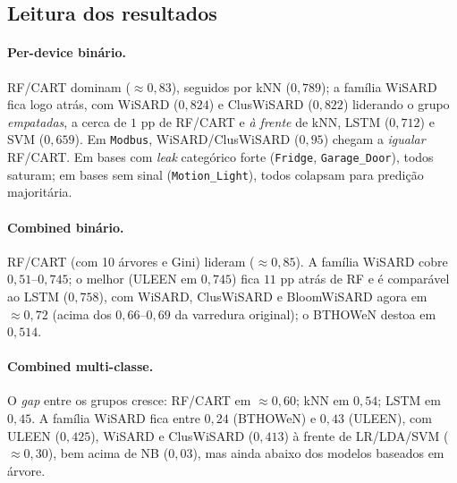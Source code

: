 \subsection{Leitura dos resultados}
\label{sec:leitura}

\paragraph{Per-device binário.} RF/CART dominam ($\approx 0{,}83$),
seguidos por kNN ($0{,}789$); a família WiSARD fica logo atrás, com
WiSARD ($0{,}824$) e ClusWiSARD ($0{,}822$) liderando o grupo
\emph{empatadas}, a cerca de $1$ pp de RF/CART e \emph{à frente} de
kNN, LSTM ($0{,}712$) e SVM ($0{,}659$). Em \texttt{Modbus},
WiSARD/ClusWiSARD ($0{,}95$) chegam a \emph{igualar} RF/CART. Em bases
com \emph{leak} categórico forte (\texttt{Fridge}, \texttt{Garage\_Door}),
todos saturam; em bases sem sinal (\texttt{Motion\_Light}), todos
colapsam para predição majoritária.

\paragraph{Combined binário.} RF/CART (com 10 árvores e Gini)
lideram ($\approx 0{,}85$). A família WiSARD cobre $0{,}51$--$0{,}745$;
o melhor (ULEEN em $0{,}745$) fica $11$ pp atrás de RF e é comparável
ao LSTM ($0{,}758$), com WiSARD, ClusWiSARD e BloomWiSARD agora em
$\approx 0{,}72$ (acima dos $0{,}66$--$0{,}69$ da varredura original);
o BTHOWeN destoa em $0{,}514$.

\paragraph{Combined multi-classe.} O \emph{gap} entre os grupos cresce:
RF/CART em $\approx 0{,}60$; kNN em $0{,}54$; LSTM em $0{,}45$. A
família WiSARD fica entre $0{,}24$ (BTHOWeN) e $0{,}43$ (ULEEN), com
ULEEN ($0{,}425$), WiSARD e ClusWiSARD ($0{,}413$) à frente de
LR/LDA/SVM ($\approx 0{,}30$), bem acima de NB ($0{,}03$), mas ainda
abaixo dos modelos baseados em árvore.

